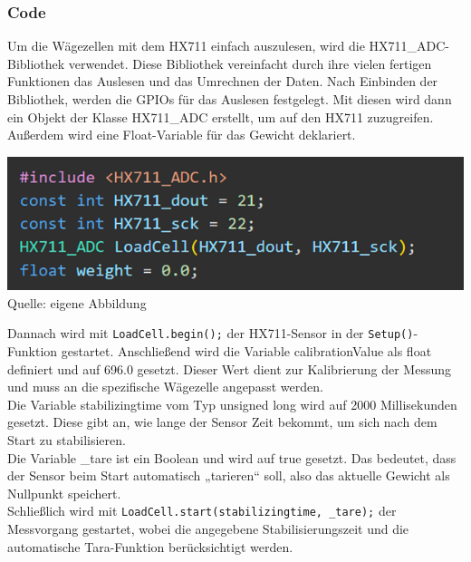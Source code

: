 \documentclass[ngerman,12pt,a4paper]{article}
\begin{document}
		\subsubsection{Code}
		Um die Wägezellen mit dem HX711 einfach auszulesen, wird die HX711\_ADC- Bibliothek verwendet. Diese Bibliothek vereinfacht durch ihre vielen fertigen Funktionen das Auslesen und das Umrechnen der Daten. Nach Einbinden der Bibliothek, werden die GPIOs für das Auslesen festgelegt. Mit diesen wird dann ein Objekt der Klasse HX711\_ADC erstellt, um auf den HX711 zuzugreifen. Außerdem wird eine Float-Variable für das Gewicht deklariert.\\
		\begin{center}
			\begin{minipage}{0.8\textwidth}
				\centering
				\includegraphics[width=\textwidth]{Pictures/code_hx711_libary}
				\label{fig:code_hx711_libary}
				\vspace{-3pt}
				{\small Quelle: {eigene Abbildung}}
			\end{minipage}
		\end{center}
		\newpage \noindent
		Dannach wird mit \texttt{LoadCell.begin();} der HX711-Sensor in der \texttt{Setup()}-Funktion gestartet. Anschließend wird die Variable calibrationValue als float definiert und auf 696.0 gesetzt. Dieser Wert dient zur Kalibrierung der Messung und muss an die spezifische Wägezelle angepasst werden. \\ [0.3cm]
		Die Variable stabilizingtime vom Typ unsigned long wird auf 2000 Millisekunden gesetzt. Diese gibt an, wie lange der Sensor Zeit bekommt, um sich nach dem Start zu stabilisieren. \\ [0.3cm]
		Die Variable \_tare ist ein Boolean und wird auf true gesetzt. Das bedeutet, dass der Sensor beim Start automatisch „tarieren“ soll, also das aktuelle Gewicht als Nullpunkt speichert. \\ [0.3cm]
		Schließlich wird mit \texttt{LoadCell.start(stabilizingtime, \_tare);} der Messvorgang gestartet, wobei die angegebene Stabilisierungszeit und die automatische Tara-Funktion berücksichtigt werden. \\ [0.3cm]
\end{document}
